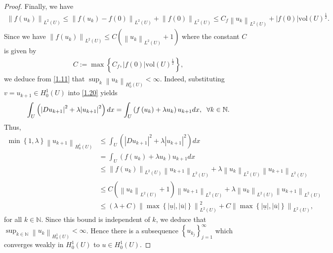 \documentclass[11pt,a4paper,center,notitlepage]{article}
\numberwithin{equation}{section}
\begin{document}
\begin{proof}
Finally, we have
\begin{align}
{\left\| {f\left( {{u_k}} \right)} \right\|_{{L^2}\left( U \right)}} \le {\left\| {f\left( {{u_k}} \right) - f\left( 0 \right)} \right\|_{{L^2}\left( U \right)}} + {\left\| {f\left( 0 \right)} \right\|_{{L^2}\left( U \right)}}  \le {C_f}{\left\| {{u_k}} \right\|_{{L^2}\left( U \right)}} + \left| {f\left( 0 \right)} \right|\mbox{vol}{\left( U \right)^{\frac{1}{2}}}.
\end{align}
Since we have ${\left\| {f\left( {{u_k}} \right)} \right\|_{{L^2}\left( U \right)}} \le C\left( {{{\left\| {{u_k}} \right\|}_{{L^2}\left( U \right)}} + 1} \right)$ where the constant $C$ is given by 
\begin{align}
C := \max \left\{ {{C_f},\left| {f\left( 0 \right)} \right|\mbox{vol}{{\left( U \right)}^{\frac{1}{2}}}} \right\}, 
\end{align}
we deduce from \eqref{1.11} that ${\sup _k}{\left\| {{u_k}} \right\|_{H_0^1\left( U \right)}} < \infty $. Indeed, substituting $v = u_{k+1}\in H_0^1\left(U\right)$ into \eqref{1.20} yields
\begin{align}
\int_U {\left( {{{\left| {D{u_{k + 1}}} \right|}^2} + \lambda {{\left| {{u_{k + 1}}} \right|}^2}} \right)dx}  = \int_U {\left( {f\left( {{u_k}} \right) + \lambda {u_k}} \right){u_{k + 1}}dx} ,\hspace{2mm}\forall k \in \mathbb{N}.
\end{align}
Thus,
\begin{align}
\min \left\{ {1,\lambda } \right\}{\left\| {{u_{k + 1}}} \right\|_{H_0^1\left( U \right)}} & \le \int_U {\left( {{{\left| {D{u_{k + 1}}} \right|}^2} + \lambda {{\left| {{u_{k + 1}}} \right|}^2}} \right)dx} \\
& = \int_U {\left( {f\left( {{u_k}} \right) + \lambda {u_k}} \right){u_{k + 1}}dx} \\
& \le {\left\| {f\left( {{u_k}} \right)} \right\|_{{L^2}\left( U \right)}}{\left\| {{u_{k + 1}}} \right\|_{{L^2}\left( U \right)}} + \lambda {\left\| {{u_k}} \right\|_{{L^2}\left( U \right)}}{\left\| {{u_{k + 1}}} \right\|_{{L^2}\left( U \right)}}\\
& \le C\left( {{{\left\| {{u_k}} \right\|}_{{L^2}\left( U \right)}} + 1} \right){\left\| {{u_{k + 1}}} \right\|_{{L^2}\left( U \right)}} + \lambda {\left\| {{u_k}} \right\|_{{L^2}\left( U \right)}}{\left\| {{u_{k + 1}}} \right\|_{{L^2}\left( U \right)}}\\
& \le \left( {\lambda  + C} \right)\left\| {\max \left\{ {\left| {\underline u } \right|,\left| {\overline u } \right|} \right\}} \right\|_{{L^2}\left( U \right)}^2 + C{\left\| {\max \left\{ {\left| {\underline u } \right|,\left| {\overline u } \right|} \right\}} \right\|_{{L^2}\left( U \right)}},
\end{align}
for all $k\in \mathbb{N}$. Since this bound is independent of $k$, we deduce that ${\sup _{k\in \mathbb{N}}}{\left\| {{u_k}} \right\|_{H_0^1\left( U \right)}} < \infty $. Hence there is a subsequence $\left\{ {{u_{{k_j}}}} \right\}_{j = 1}^\infty $ which converges weakly in $H_0^1\left(U\right)$ to $u\in H_0^1\left(U\right)$. 


\end{proof}
\end{document}
